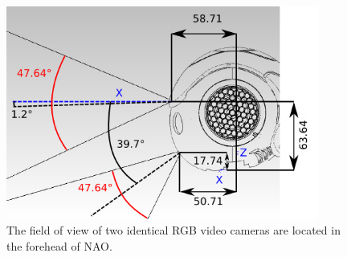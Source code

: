 \begin{figure}
	[h] \centering 
	\includegraphics[height=7cm]{figures/content/nao-vision.jpg} \caption{The field of view of two identical RGB video cameras are located in the forehead of NAO. \cite{nao-spec} } \label{fg:nao:vision} 
\end{figure}
